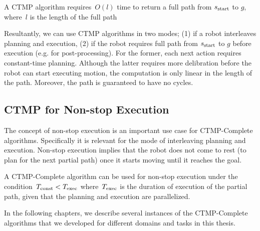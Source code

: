 \documentclass[a4paper]{report}
\begin{document}
\vspace{2mm}
\begin{property}
\label{ctmp:prop2}
A CTMP algorithm requires~$O(l)$ time to return a full path from $s_{\text{start}}$ to $g$, where~$l$ is the length of the full path
\end{property}

Resultantly, we can use CTMP algorithms in two modes; (1) if a robot interleaves planning and execution, (2) if the robot requires full path from $s_{\text{start}}$ to $g$ before execution (e.g. for post-processing). For the former, each next action requires constant-time planning. Although the latter requires more delibration before the robot can start executing motion, the computation is only linear in the length of the path. Moreover, the path is guaranteed to have no cycles.


\subsection{CTMP for Non-stop Execution}
The concept of non-stop execution is an important use case for CTMP-Complete algorithms. Specifically it is relevant for the mode of interleaving planning and execution. Non-stop execution implies that the robot does not come to rest (to plan for the next partial path) once it starts moving until it reaches the goal.

\vspace{2mm}
\begin{definition}
A CTMP-Complete algorithm can be used for non-stop execution under the condition~$T_{\textrm{const}} < T_{\textrm{exec}}$ where~$T_{\textrm{exec}}$ is the duration of execution of the partial path, given that the planning and execution are parallelized. 
\end{definition}
%
In the following chapters, we describe several instances of the CTMP-Complete algorithms that we developed for different domains and tasks in this thesis.
\end{document}
